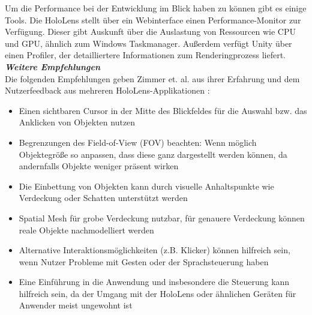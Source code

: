 Um die Performance bei der Entwicklung im Blick haben zu können gibt es einige Tools. Die HoloLens stellt über ein Webinterface einen Performance-Monitor zur Verfügung. Dieser gibt Auskunft über die Auslastung von Ressourcen wie CPU und GPU, ähnlich zum Windows Taskmanager. Außerdem verfügt Unity über einen Profiler, der detailliertere Informationen zum Renderingprozess liefert.\\

\textbf{\textit{Weitere Empfehlungen}}\\
Die folgenden Empfehlungen geben Zimmer et. al. aus ihrer Erfahrung und dem Nutzerfeedback aus mehreren HoloLens-Applikationen \cite{Zimmer17}:
\begin{itemize}[topsep=-2px]
	\setlength{\itemsep}{-1pt}
	\singlespacing
	\item Einen sichtbaren Cursor in der Mitte des Blickfeldes für die Auswahl bzw. das Anklicken von Objekten nutzen
	\item Begrenzungen des Field-of-View (FOV) beachten: Wenn möglich Objektegröße so anpassen, dass diese ganz dargestellt werden können, da andernfalls Objekte weniger präsent wirken
	\item Die Einbettung von Objekten kann durch visuelle Anhaltspunkte wie Verdeckung oder Schatten unterstützt werden
	\item Spatial Mesh für grobe Verdeckung nutzbar, für genauere Verdeckung können reale Objekte nachmodelliert werden 
	\item Alternative Interaktionsmöglichkeiten (z.B. Klicker) können hilfreich sein, wenn Nutzer Probleme mit Gesten oder der Sprachsteuerung haben
	\item Eine Einführung in die Anwendung und insbesondere die Steuerung kann hilfreich sein, da der Umgang mit der HoloLens oder ähnlichen Geräten für Anwender meist ungewohnt ist
\end{itemize}
\vspace{6px}




